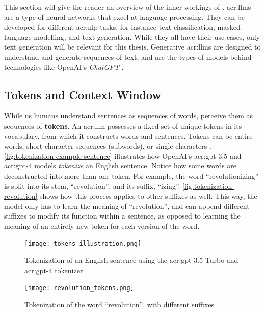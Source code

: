This section will give the reader an overview of the inner workings of . \glspl{acr:llm} are a type of neural networks that excel at language processing. They can be developed for different \gls{acr:nlp} tasks, for instance text classification, masked language modelling, and text generation. While they all have their use cases, only text generation will be relevant for this thesis. Generative \glspl{acr:llm} are designed to understand and generate sequences of text, and are the types of models behind technologies like OpenAI's \textit{ChatGPT} \citep{openaiIntroducingChatGPT2022}.

\subsection{Tokens and Context Window}
\label{subsec:core-concepts}

While us humans understand sentences as sequences of words,  perceive them as sequences of \textbf{tokens}. An \acrshort{acr:llm} possesses a fixed set of unique tokens in its vocabulary, from which it constructs words and sentences. Tokens can be entire words, short character sequences (subwords), or single characters \citep{aliTokenizerChoiceLLM2024}. \autoref{fig:tokenization-example-sentence} illustrates how OpenAI's \acrshort{acr:gpt}-3.5 and \acrshort{acr:gpt}-4 models \textit{tokenize} an English sentence. Notice how some words are deconstructed into more than one token. For example, the word \enquote{revolutionizing} is split into its stem, \enquote{revolution}, and its suffix, \enquote{izing}. \autoref{fig:tokenization-revolution} shows how this process applies to other suffixes as well. This way, the model only has to learn the meaning of \enquote{revolution}, and can append different suffixes to modify its function within a sentence, as opposed to learning the meaning of an entirely new token for each version of the word.

\begin{figure}[htp]
    \centering
    \texttt{[image: tokens\_illustration.png]}
    \caption{Tokenization of an English sentence using the \acrshort{acr:gpt}-3.5 Turbo and \acrshort{acr:gpt}-4 tokenizer}
    \label{fig:tokenization-example-sentence}
\end{figure}

\begin{figure}[htp]
    \centering
    \texttt{[image: revolution\_tokens.png]}
    \caption{Tokenization of the word \enquote{revolution}, with different suffixes}
    \label{fig:tokenization-revolution}
\end{figure}

